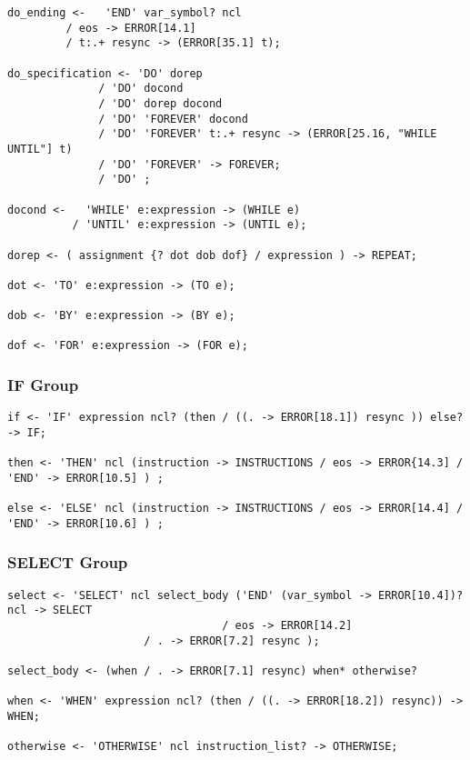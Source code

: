 \begin{verbatim}
do_ending <-   'END' var_symbol? ncl 
		 / eos -> ERROR[14.1]
		 / t:.+ resync -> (ERROR[35.1] t);

do_specification <- 'DO' dorep 
		      / 'DO' docond 
		      / 'DO' dorep docond 
		      / 'DO' 'FOREVER' docond      
		      / 'DO' 'FOREVER' t:.+ resync -> (ERROR[25.16, "WHILE UNTIL"] t)
		      / 'DO' 'FOREVER' -> FOREVER;
		      / 'DO' ;

docond <-   'WHILE' e:expression -> (WHILE e)
          / 'UNTIL' e:expression -> (UNTIL e);

dorep <- ( assignment {? dot dob dof} / expression ) -> REPEAT;

dot <- 'TO' e:expression -> (TO e);

dob <- 'BY' e:expression -> (BY e);

dof <- 'FOR' e:expression -> (FOR e);
\end{verbatim}

\subsubsection{IF Group}

\begin{verbatim}
if <- 'IF' expression ncl? (then / ((. -> ERROR[18.1]) resync )) else? -> IF;

then <- 'THEN' ncl (instruction -> INSTRUCTIONS / eos -> ERROR{14.3] / 'END' -> ERROR[10.5] ) ;

else <- 'ELSE' ncl (instruction -> INSTRUCTIONS / eos -> ERROR[14.4] / 'END' -> ERROR[10.6] ) ;
\end{verbatim}

\subsubsection{SELECT Group}

\begin{verbatim}
select <- 'SELECT' ncl select_body ('END' (var_symbol -> ERROR[10.4])? ncl -> SELECT
                                 / eos -> ERROR[14.2] 
            		 / . -> ERROR[7.2] resync );

select_body <- (when / . -> ERROR[7.1] resync) when* otherwise?

when <- 'WHEN' expression ncl? (then / ((. -> ERROR[18.2]) resync)) -> WHEN;

otherwise <- 'OTHERWISE' ncl instruction_list? -> OTHERWISE;
\end{verbatim}


